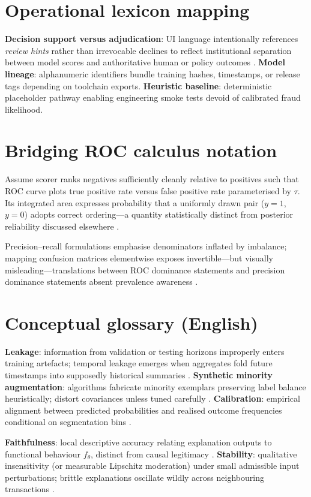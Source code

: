 \section{Operational lexicon mapping}
\textbf{Decision support versus adjudication}: UI language intentionally references \emph{review hints} rather than irrevocable declines to reflect institutional separation between model scores and authoritative human or policy outcomes \cite{fraud_handbook}. \textbf{Model lineage}: alphanumeric identifiers bundle training hashes, timestamps, or release tags depending on toolchain exports. \textbf{Heuristic baseline}: deterministic placeholder pathway enabling engineering smoke tests devoid of calibrated fraud likelihood.

\section*{Bridging ROC calculus notation}
Assume scorer ranks negatives sufficiently cleanly relative to positives such that ROC curve plots true positive rate versus false positive rate parameterised by $\tau$. Its integrated area expresses probability that a uniformly drawn pair ($y{=}1$, $y{=}0$) adopts correct ordering—a quantity statistically distinct from posterior reliability discussed elsewhere \cite{davis_goadrich_icml06}.

Precision--recall formulations emphasise denominators inflated by imbalance; mapping confusion matrices elementwise exposes invertible—but visually misleading—translations between ROC dominance statements and precision dominance statements absent prevalence awareness \cite{davis_goadrich_icml06}.

\section*{Conceptual glossary (English)}
\textbf{Leakage}: information from validation or testing horizons improperly enters training artefacts; temporal leakage emerges when aggregates fold future timestamps into supposedly historical summaries \cite{fraud_handbook}. \textbf{Synthetic minority augmentation}: algorithms fabricate minority exemplars preserving label balance heuristically; distort covariances unless tuned carefully \cite{he_garcia_imbalanced2009}. \textbf{Calibration}: empirical alignment between predicted probabilities and realised outcome frequencies conditional on segmentation bins \cite{niculescu_caruana_calib2005}.

\textbf{Faithfulness}: local descriptive accuracy relating explanation outputs to functional behaviour $f_\theta$, distinct from causal legitimacy \cite{xai_survey}. \textbf{Stability}: qualitative insensitivity (or measurable Lipschitz moderation) under small admissible input perturbations; brittle explanations oscillate wildly across neighbouring transactions \cite{xai_survey}.

